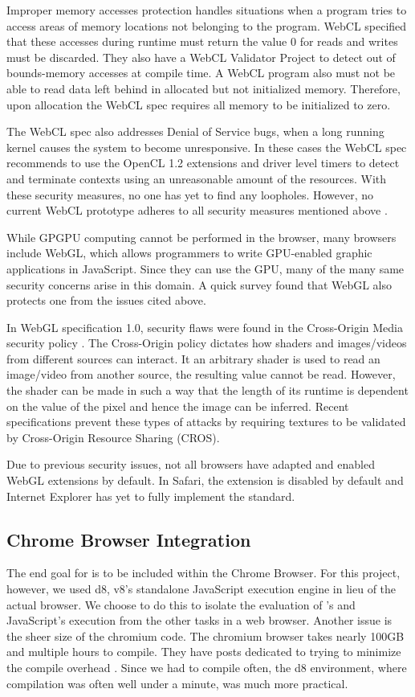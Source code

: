 Improper memory accesses protection handles situations when a program tries to
access areas of memory locations not belonging to the program. WebCL
specified that these accesses during runtime must return the value 0 for reads
and writes must be discarded. They also have a WebCL Validator Project
\cite{webclValidator} to detect out of bounds-memory accesses at compile time. A
WebCL program also must not be able to read data left behind in allocated but
not initialized memory. Therefore, upon allocation the WebCL spec requires all
memory to be initialized to zero.

The WebCL spec also addresses Denial of Service bugs, when a long running kernel
causes the system to become unresponsive. In these cases the WebCL spec
recommends to use the OpenCL 1.2 extensions and driver level timers to detect
and terminate contexts using an unreasonable amount of the resources.
With these security measures, no one has yet to find any loopholes. However, no
current WebCL prototype adheres to all security measures mentioned above
\cite{nokiasecurity}.

While GPGPU computing cannot be performed in the browser, many browsers include
WebGL, which allows programmers to write GPU-enabled graphic applications in
JavaScript. Since they can use the GPU, many of the many same security concerns
arise in this domain. A quick survey found that WebGL also protects one from the
issues cited above.

In WebGL specification 1.0, security flaws were found in the Cross-Origin
Media security policy \cite{webGLerror1, webGLerror2}. The Cross-Origin policy
dictates how shaders and images/videos from different sources can interact. It
an arbitrary shader is used to read an image/video from another source, the
resulting value cannot be read. However, the shader can be made in such a way
that the length of its runtime is dependent on the value of the pixel and hence
the image can be inferred. Recent specifications prevent these types of attacks
by requiring textures to be validated by Cross-Origin Resource Sharing
(CROS).

Due to previous security issues, not all browsers have adapted and enabled WebGL
extensions by default. In Safari, the extension is disabled by
default and Internet Explorer has yet to fully implement the standard.

\subsection{Chrome Browser Integration} 
\label{chromeIntegration}
The end goal for \name is to be included within the
Chrome Browser. For this project, however, we used d8, v8's standalone
JavaScript execution engine in lieu of the actual browser. We choose to do this
to isolate the evaluation of \namens's and JavaScript's execution from the other
tasks in a web browser.  Another issue is the sheer size of the chromium code.
The chromium browser takes nearly 100GB and multiple hours to compile. They have
posts dedicated to trying to minimize the compile overhead
\cite{linuxfasterbuilds}.  Since we had to compile often, the d8 environment,
where compilation was often well under a minute, was much more practical.

